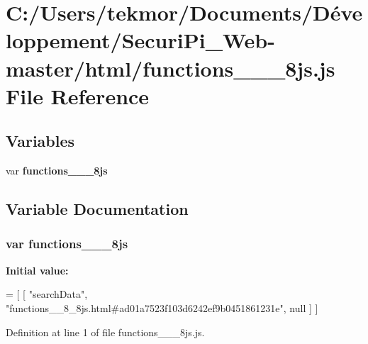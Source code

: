 \section{C\+:/\+Users/tekmor/\+Documents/\+Développement/\+Securi\+Pi\+\_\+\+Web-\/master/html/functions\+\_\+\+\_\+\_\+8js.js File Reference}
\label{functions____8__8js_8js}
\subsection*{Variables}
\begin{DoxyCompactItemize}
\item 
var {\bf functions\+\_\+\+\_\+\_\+8js}
\end{DoxyCompactItemize}


\subsection{Variable Documentation}
\subsubsection[{functions\+\_\+\+\_\+8\+\_\+8js}]{\setlength{\rightskip}{0pt plus 5cm}var functions\+\_\+\+\_\+\_\+8js}\label{functions____8__8js_8js_a7b3f0423c15dc09e8d1003771c4d30f8}
{\bfseries Initial value\+:}
\begin{DoxyCode}
=
[
    [ \textcolor{stringliteral}{"searchData"}, \textcolor{stringliteral}{"functions\_\_8\_8js.html#ad01a7523f103d6242ef9b0451861231e"}, null ]
]
\end{DoxyCode}


Definition at line 1 of file functions\+\_\+\+\_\+\_\+8js.\+js.

